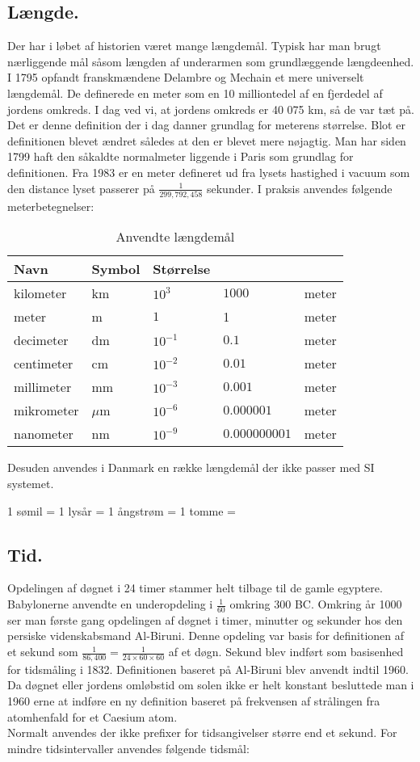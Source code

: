\documentclass{article}
\begin{document}
\subsection{Længde.}
Der har i løbet af historien været mange længdemål. Typisk har man brugt nærliggende mål såsom længden af underarmen som grundlæggende længdeenhed. I 1795 opfandt franskmændene Delambre og Mechain et mere universelt længdemål. De definerede en meter som en 10 milliontedel af en fjerdedel af jordens omkreds. I dag ved vi, at jordens omkreds er 40 075 km, så de var tæt på. Det er denne definition der i dag danner grundlag for meterens størrelse. Blot er definitionen blevet ændret således at den er blevet mere nøjagtig. Man har siden 1799 haft den såkaldte normalmeter liggende i Paris som grundlag for definitionen. Fra 1983 er en meter defineret ud fra lysets hastighed i vacuum som den distance lyset passerer på \(\frac{1}{299,792,458}\) sekunder. I praksis anvendes følgende meterbetegnelser:

\begin{table}[h]
\caption{Anvendte længdemål}
\begin{tabular}{lllll}
\toprule
Navn &Symbol &Størrelse  &\\\midrule
kilometer&km&$10^3$&$1000$&meter\\
meter&m&$1$&1&meter\\
decimeter&dm&$10^{-1}$&$0.1$&meter\\
centimeter&cm&$10^{-2}$&$0.01$&meter\\	
millimeter&mm&$10^{-3}$&$0.001$&meter\\
mikrometer&$\mu$m&$10^{-6}$&$0.000001$&meter\\	%
nanometer&nm&$10^{-9}$&$0.000000001$&meter\\\midrule
\end{tabular}
\end{table}

Desuden anvendes i Danmark en række længdemål der ikke passer med SI systemet.

1 sømil = 
1 lysår =
1 ångstrøm =
1 tomme =

\subsection{Tid.}
Opdelingen af døgnet i 24 timer stammer helt tilbage til de gamle egyptere. Babylonerne anvendte en underopdeling i \(\frac{1}{60}\) omkring 300 BC. Omkring år 1000 ser man første gang opdelingen af døgnet i timer, minutter og sekunder hos den persiske videnskabsmand Al-Biruni. Denne opdeling var basis for definitionen af et sekund som \(\frac{1}{86,400}=\frac{1}{24 \times 60 \times 60}\) af et døgn. Sekund blev indført som basisenhed for tidsmåling i 1832. Definitionen baseret på Al-Biruni blev anvendt indtil 1960. Da døgnet eller jordens omløbstid om solen ikke er helt konstant besluttede man i 1960 erne at indføre en ny definition baseret på frekvensen af strålingen fra atomhenfald for et Caesium atom.\\
Normalt anvendes der ikke prefixer for tidsangivelser større end et sekund. For mindre tidsintervaller anvendes følgende tidsmål:
\end{document}
